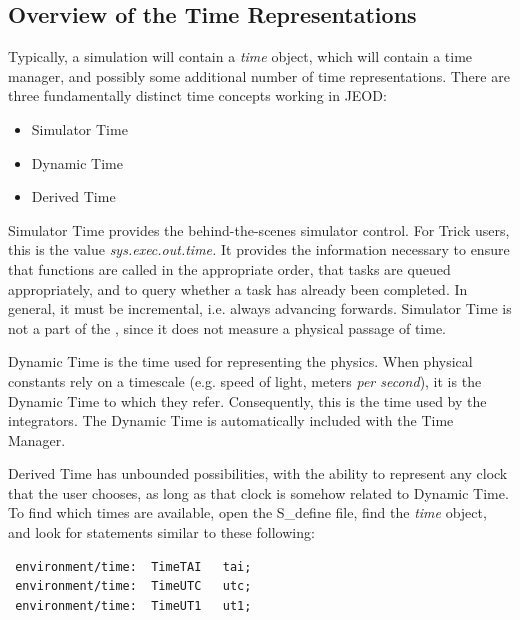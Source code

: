 %
%
% 
%

\label{sec:User_Analysis}
\subsection{Overview of the Time Representations}
Typically, a simulation will contain a \textit{time} object, which will
contain a time manager, and possibly some additional number of time
representations.  There are three fundamentally distinct time concepts
working in JEOD:


\begin{itemize}
\item Simulator Time
\item Dynamic Time
\item Derived Time
\end{itemize}



Simulator Time provides the behind-the-scenes simulator control.  For
Trick users, this is the value \textit{sys.exec.out.time.} It provides
the information necessary to ensure that functions are called in the
appropriate order, that tasks are queued appropriately, and to query
whether a task has already been completed.  In general, it must be
incremental, i.e. always advancing forwards.  Simulator Time is not a
part of the \timeDesc, since it does not measure a physical passage of
time.

Dynamic Time is the time used for representing the physics.  When
physical constants rely on a timescale (e.g. speed of light, meters
\textit{per second}), it is the Dynamic Time to which they refer.
Consequently, this is the time used by the integrators.  The Dynamic
Time is automatically included with the Time Manager.

Derived Time has unbounded possibilities, with the ability to represent
any clock that the user chooses, as long as that clock is somehow
related to Dynamic Time.  To find which times are available, open the
S\_define file, find the \textit{time }object, and look for statements
similar to these following:

\begin{verbatim}
 environment/time:  TimeTAI   tai;
 environment/time:  TimeUTC   utc;
 environment/time:  TimeUT1   ut1;
\end{verbatim}

